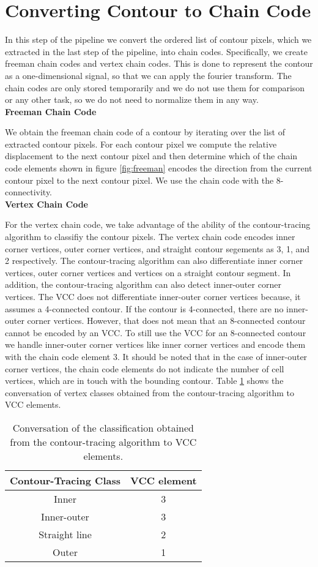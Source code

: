 \documentclass[thesis.tex]{subfiles}
\begin{document}
\section{Converting Contour to Chain Code}
In this step of the pipeline we convert the ordered list of contour pixels, which we extracted in the last step of the pipeline, into chain codes.  Specifically, we create freeman chain codes and vertex chain codes. This is done to represent the contour as a one-dimensional signal, so that we can apply the fourier transform. The chain codes are only stored temporarily and we do not use them for comparison or any other task, so we do not need to normalize them in any way. \\

\textbf{Freeman Chain Code}

We obtain the freeman chain code of a contour by iterating over the list of extracted contour pixels. For each contour pixel we compute the relative displacement to the next contour pixel and then determine which of the chain code elements shown in figure \ref{fig:freeman} encodes the direction from the current contour pixel to the next contour pixel. We use the chain code with the 8-connectivity. \\

\textbf{Vertex Chain Code}

For the vertex chain code, we take advantage of the ability of the contour-tracing algorithm to classifiy the contour pixels. The vertex chain code encodes inner corner vertices, outer corner vertices, and straight contour segements as 3, 1, and 2 respectively. The contour-tracing algorithm can also differentiate inner corner vertices, outer corner vertices and vertices on a straight contour segment. In addition, the contour-tracing algorithm can also detect inner-outer corner vertices. The VCC does not differentiate inner-outer corner vertices because, it assumes a 4-connected contour. If the contour is 4-connected, there are no inner-outer corner vertices. However, that does not mean that an 8-connected contour cannot be encoded by an VCC. To still use the VCC for an 8-connected contour we handle inner-outer corner vertices like inner corner vertices and encode them with the chain code element 3. It should be noted that in the case of inner-outer corner vertices, the chain code elements do not indicate the number of cell vertices, which are in touch with the bounding contour. Table \ref{vcc_table}  shows the conversation of vertex classes obtained from the contour-tracing algorithm to VCC elements.
\begin{table}[h!]
\centering
 \begin{tabular}{||c c||} 
 \hline
 Contour-Tracing Class &  VCC element\\ [0.5ex] 
 \hline\hline
 Inner & 3 \\ 
 \hline
 Inner-outer & 3 \\
 \hline
 Straight line & 2 \\
 \hline
 Outer & 1 \\
 \hline
 \hline
\end{tabular}
\caption{Conversation of the classification obtained from the contour-tracing algorithm to VCC elements.}
\label{vcc_table}
\end{table}
\end{document}
